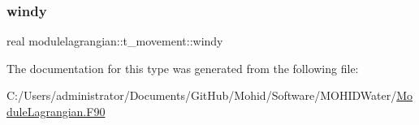 \subsubsection{\texorpdfstring{windy}{windy}}
{\footnotesize\ttfamily real modulelagrangian\+::t\+\_\+movement\+::windy\hspace{0.3cm}{\ttfamily [private]}}



The documentation for this type was generated from the following file\+:\begin{DoxyCompactItemize}
\item 
C\+:/\+Users/administrator/\+Documents/\+Git\+Hub/\+Mohid/\+Software/\+M\+O\+H\+I\+D\+Water/\mbox{\hyperlink{_module_lagrangian_8_f90}{Module\+Lagrangian.\+F90}}\end{DoxyCompactItemize}
